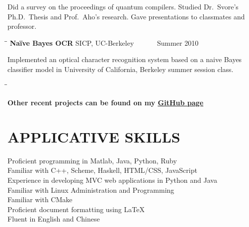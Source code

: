 \documentclass{res}
\begin{document}
\begin{resume}
    Did a survey on the proceedings of quantum compilers. Studied Dr.\ Svore's Ph.D.\ Thesis and Prof.\ Aho's research. Gave presentations to classmates and  professor.
      \begin{tabbing}%
   \hspace{2.3in}\= \hspace{2.6in}\= \kill %
   {\bf Na\"{i}ve Bayes OCR}  \>SICP, UC-Berkeley\> ~~~~~~Summer 2010\\
   \end{tabbing}\vspace{-20pt}
    Implemented an optical character recognition system based on a naive Bayes classifier model in University of California, Berkeley summer session class. 
    \begin{tabbing}
   \hspace{2.3in}\= \hspace{2.6in}\= \kill %
 
    {\bf Other recent projects can be found on my \href{https://github.com/tingleshao}{\underline{GitHub page}}} 
  \end{tabbing}
  
  

\section{APPLICATIVE SKILLS}      
    \vspace{0.05in}    
    Proficient programming in Matlab, Java, Python, Ruby  \\
    Familiar with C++, Scheme, Haskell, HTML/CSS, JavaScript\\
    Experience in developing MVC web applications in Python and Java\\
    Familiar with Linux Administration and Programming \\ 
    Familiar with CMake\\
    Proficient document formatting using \LaTeX \\
    Fluent in English and Chinese
    

\end{resume}
\end{document}
